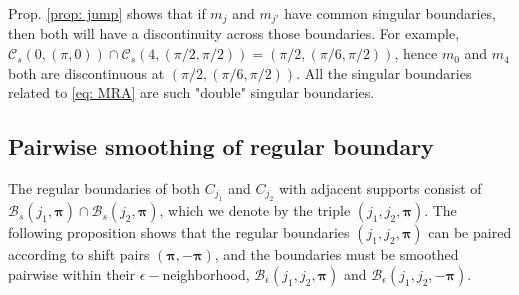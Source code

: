 Prop. \ref{prop: jump} shows that if $m_j$ and $m_{j'}$ have common singular boundaries, then both will have a discontinuity across those boundaries. For example, $\mathcal{C}_s(0,(\pi,0))\cap\mathcal{C}_s(4,(\pi/2,\pi/2)) = (\pi/2,(\pi/6,\pi/2))$, hence $m_0$ and $m_4$ both are discontinuous at $(\pi/2,(\pi/6,\pi/2))$. All the singular boundaries related to \eqref{eq: MRA} are such "double" singular boundaries.

\subsection{Pairwise smoothing of regular boundary}
The regular boundaries of both $C_{j_1}$ and $C_{j_2}$ with adjacent supports consist of $\mathcal{B}_s(j_1,\boldsymbol{\pi})\cap\mathcal{B}_s(j_2,\boldsymbol{\pi})$, which we denote by the triple $(j_1,j_2,\boldsymbol{\pi})$. The following proposition shows that the regular boundaries $(j_1,j_2,\boldsymbol{\pi})$ can be paired according to shift pairs $(\boldsymbol{\pi},-\boldsymbol{\pi})$, and the boundaries must be smoothed pairwise within their $\epsilon-$neighborhood, $\mathcal{B}_{\epsilon}(j_1,j_2,\boldsymbol{\pi})$ and $\mathcal{B}_{\epsilon}(j_1,j_2,-\boldsymbol{\pi})$.

